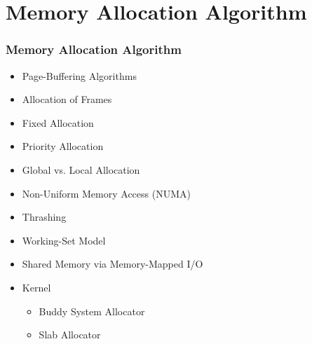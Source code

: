 \documentclass[aspectratio=169, xcolor=table, notheorems, hyperref={pdfpagelabels=false}]{beamer}
\begin{document}
\section{Memory Allocation Algorithm}
\begin{frame}
\frametitle{Memory Allocation Algorithm}
\begin{itemize}
\item Page-Buffering Algorithms
\item Allocation of Frames
\item Fixed Allocation
\item Priority Allocation
\item Global vs. Local Allocation
\item Non-Uniform Memory Access (NUMA)
\item Thrashing
\item Working-Set Model
\item Shared Memory via Memory-Mapped I/O
\item Kernel
\begin{itemize}
\item Buddy System Allocator
\item Slab Allocator
\end{itemize}
\end{itemize}
\end{frame}

\end{document}
